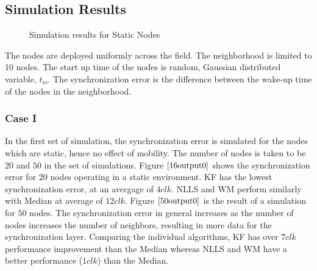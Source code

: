 \documentclass[journal]{IEEEtran}
\begin{document}
\subsection{\textbf{Simulation Results}}
\begin{figure}
\centerline{
\hfil
{}}
\caption{Simulation results for Static Nodes }
\label{static}
\end{figure}
The nodes are deployed uniformly across the field. The neighborhood is limited
to 10 nodes. The start up time of the
nodes is random, Gaussian distributed variable, $t_{io}$. The
synchronization error is the difference between the wake-up time of the nodes in the
neighborhood.
\subsubsection{\textbf{Case I}} In the first set of simulation, the
synchronization error is simulated for the nodes which are static,
hence no effect of mobility. The number of nodes is taken to be $20$
and $50$ in the set of simulations.
\newline
Figure $\ref{16output0}$ shows the synchronization error for $20$ nodes operating in a static environment. KF has the lowest synchronization error, at an avergage of $4clk$. NLLS and WM perform similarly with Median at average of
$12clk$. \newline
Figure $\ref{50output0}$ is the result of a simulation for $50$ nodes. The synchronization error in general increases as the number of nodes increases the number of neighbors, resulting in more data for the synchronization layer. Comparing the individual algorithms, KF has over $7clk$ performance improvement than the Median whereas NLLS and WM have a better performance ($1clk$) than the Median.
\end{document}

